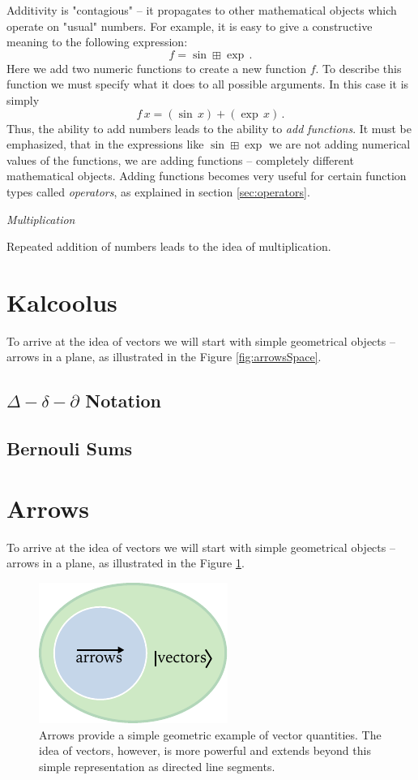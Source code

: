 Additivity is "contagious" -- it propagates to other mathematical objects which operate on "usual" numbers. For example, it is easy to give a constructive meaning to the following expression:
\[
f = \sin\boxplus\exp\,.
\]
Here we add two numeric functions to create a new function $f$. To describe this function we must specify what it does to all possible arguments. In this case it is simply
\[
f\,x=(\sin\, x)+(\exp\, x)\,.
\]
Thus, the ability to add numbers leads to the ability to \emph{add functions}. It must be emphasized, that in the expressions like $\sin\boxplus\exp$ we are not adding numerical values of the functions, we are adding functions -- completely different mathematical objects. Adding functions becomes very useful for certain function types called \emph{operators}, as explained in section \ref{sec:operators}.

\begin{flushleft}
	{\it Multiplication}
\end{flushleft}
Repeated addition of numbers leads to the idea of multiplication.


\section{Kalcoolus}

To arrive at the idea of vectors we will start with simple geometrical
objects -- arrows in a plane, as illustrated in the Figure \ref{fig:arrowsSpace}.

\subsection{$\Delta-\delta-\partial$ Notation}

\subsection{Bernouli Sums}

\section{Arrows}

To arrive at the idea of vectors we will start with simple geometrical
objects -- arrows in a plane, as illustrated in the Figure \ref{fig:arrowsAndVectors}.

\begin{figure}[htbp]
  \centering
  \includegraphics[scale=1.0]{arrowsAndVectors}
  \caption{Arrows provide a simple geometric example of vector quantities. The idea of vectors, however, is more powerful and extends beyond this simple representation as directed line segments.}
  \label{fig:arrowsAndVectors}
\end{figure}


